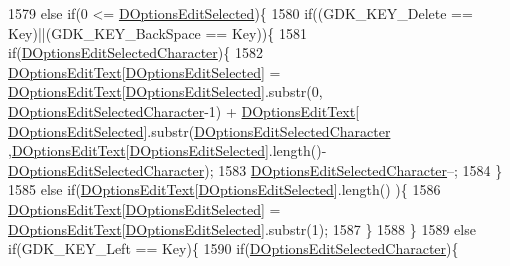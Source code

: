 \begin{DoxyCode}
1579         \textcolor{keywordflow}{else} \textcolor{keywordflow}{if}(0 <= \hyperlink{classCApplicationData_aee4aa5eb5b89b86eb2648d0f9c7358f9}{DOptionsEditSelected})\{
1580             \textcolor{keywordflow}{if}((GDK\_KEY\_Delete == Key)||(GDK\_KEY\_BackSpace == Key))\{
1581                 \textcolor{keywordflow}{if}(\hyperlink{classCApplicationData_a921d69021fc61e51d12d8a26a5ac1a89}{DOptionsEditSelectedCharacter})\{
1582                     \hyperlink{classCApplicationData_a7044dc34cbd9d6776e8ef79eb12b5ce4}{DOptionsEditText}[\hyperlink{classCApplicationData_aee4aa5eb5b89b86eb2648d0f9c7358f9}{DOptionsEditSelected}] = 
      \hyperlink{classCApplicationData_a7044dc34cbd9d6776e8ef79eb12b5ce4}{DOptionsEditText}[\hyperlink{classCApplicationData_aee4aa5eb5b89b86eb2648d0f9c7358f9}{DOptionsEditSelected}].substr(0,
      \hyperlink{classCApplicationData_a921d69021fc61e51d12d8a26a5ac1a89}{DOptionsEditSelectedCharacter}-1) + \hyperlink{classCApplicationData_a7044dc34cbd9d6776e8ef79eb12b5ce4}{DOptionsEditText}[
      \hyperlink{classCApplicationData_aee4aa5eb5b89b86eb2648d0f9c7358f9}{DOptionsEditSelected}].substr(\hyperlink{classCApplicationData_a921d69021fc61e51d12d8a26a5ac1a89}{DOptionsEditSelectedCharacter}
      ,\hyperlink{classCApplicationData_a7044dc34cbd9d6776e8ef79eb12b5ce4}{DOptionsEditText}[\hyperlink{classCApplicationData_aee4aa5eb5b89b86eb2648d0f9c7358f9}{DOptionsEditSelected}].length()-
      \hyperlink{classCApplicationData_a921d69021fc61e51d12d8a26a5ac1a89}{DOptionsEditSelectedCharacter});
1583                     \hyperlink{classCApplicationData_a921d69021fc61e51d12d8a26a5ac1a89}{DOptionsEditSelectedCharacter}--;
1584                 \}
1585                 \textcolor{keywordflow}{else} \textcolor{keywordflow}{if}(\hyperlink{classCApplicationData_a7044dc34cbd9d6776e8ef79eb12b5ce4}{DOptionsEditText}[\hyperlink{classCApplicationData_aee4aa5eb5b89b86eb2648d0f9c7358f9}{DOptionsEditSelected}].length()
      )\{
1586                     \hyperlink{classCApplicationData_a7044dc34cbd9d6776e8ef79eb12b5ce4}{DOptionsEditText}[\hyperlink{classCApplicationData_aee4aa5eb5b89b86eb2648d0f9c7358f9}{DOptionsEditSelected}] = 
      \hyperlink{classCApplicationData_a7044dc34cbd9d6776e8ef79eb12b5ce4}{DOptionsEditText}[\hyperlink{classCApplicationData_aee4aa5eb5b89b86eb2648d0f9c7358f9}{DOptionsEditSelected}].substr(1);
1587                 \}
1588             \}
1589             \textcolor{keywordflow}{else} \textcolor{keywordflow}{if}(GDK\_KEY\_Left == Key)\{
1590                 \textcolor{keywordflow}{if}(\hyperlink{classCApplicationData_a921d69021fc61e51d12d8a26a5ac1a89}{DOptionsEditSelectedCharacter})\{

\end{DoxyCode}
